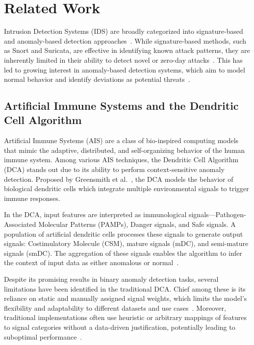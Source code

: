 \documentclass[conference]{IEEEtran}
\begin{document}
\section{Related Work}

Intrusion Detection Systems (IDS) are broadly categorized into
signature-based and anomaly-based detection
approaches~\cite{liao_intrusion_2013}. While
signature-based methods, such as Snort and Suricata, are effective in
identifying known attack patterns, they are inherently limited in
their ability to detect novel or zero-day
attacks~\cite{thomas_usefulness_2008}. This has led to
growing interest in anomaly-based detection systems, which aim to
model normal behavior and identify deviations as potential
threats~\cite{elmrabit2020evaluation}.

\subsection{Artificial Immune Systems and the Dendritic Cell Algorithm}

Artificial Immune Systems (AIS) are a class of bio-inspired computing
models that mimic the adaptive, distributed, and self-organizing
behavior of the human immune system. Among various AIS techniques,
the Dendritic Cell Algorithm (DCA) stands out due to its ability to
perform context-sensitive anomaly detection. Proposed by Greensmith
et al.~\cite{greensmith_dendritic_2007}, the DCA models the behavior of biological dendritic cells
which integrate multiple environmental signals to trigger immune responses.

In the DCA, input features are interpreted as immunological
signals—Pathogen-Associated Molecular Patterns (PAMPs), Danger
signals, and Safe signals. A population of artificial dendritic cells
processes these signals to generate output signals: Costimulatory
Molecule (CSM), mature signals (mDC), and semi-mature signals (smDC).
The aggregation of these signals enables the algorithm to infer the
context of input data as either anomalous or normal~\cite{greensmith_dca_2008}.

Despite its promising results in binary anomaly detection tasks,
several limitations have been identified in the traditional DCA.
Chief among these is its reliance on static and manually assigned
signal weights, which limits the model's flexibility and adaptability
to different datasets and use cases~\cite{mohsin_upper_2016}. Moreover, traditional
implementations often use heuristic or arbitrary mappings of features
to signal categories without a data-driven justification, potentially
leading to suboptimal performance~\cite{pinto_towards_2022}.
\end{document}
